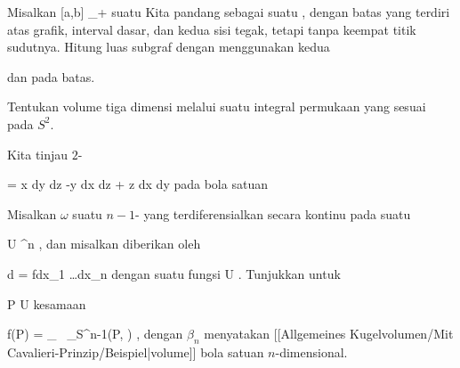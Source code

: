 {}
{

Misalkan
 { [a,b] } { \R_{+}
} {}
suatu
Kita pandang
sebagai suatu
,
dengan batas yang terdiri atas grafik, interval dasar, dan kedua sisi tegak, tetapi tanpa keempat titik sudutnya. Hitung luas subgraf dengan menggunakan kedua

 dan
pada batas.

}
{} {}

{}
{

Tentukan volume
tiga dimensi melalui suatu integral permukaan yang sesuai pada
$S^2$.

}
{} {}

{}
{

Kita tinjau
$2$-

\mavergleichskettedisp
{\vergleichskette
{ \omega
}
{ =} { x dy \wedge dz -y dx \wedge dz + z dx \wedge dy
}
{ } {
}
{ } {
}
{ } {
}
}
{}{}{}
pada bola satuan

}
{} {}

{}
{

Misalkan $\omega$ suatu
$n-1$-
yang terdiferensialkan secara kontinu pada suatu

\mavergleichskette
{\vergleichskette
{ U
}
{ \subseteq }{ \R^n
}
{  }{
}
{    }{
}
{   }{
}
}
{}{}{},
dan misalkan
diberikan oleh

\mavergleichskettedisp
{\vergleichskette
{d \omega
}
{ =} { fdx_1 \wedge \ldots \wedge dx_n
}
{ } {
}
{ } {
}
{ } {
}
}
{}{}{}
dengan suatu fungsi
 { U } {\R
} {.}
Tunjukkan untuk

\mavergleichskette
{\vergleichskette
{ P
}
{ \in }{ U
}
{  }{
}
{    }{
}
{   }{
}
}
{}{}{}
kesamaan

\mavergleichskettedisp
{\vergleichskette
{ f(P)
}
{ =} { {  } \cdot {}_{   \epsilon {}  } \, {  } \int_{S^{n-1}(P, \epsilon)} \omega
}
{ } {
}
{ } {
}
{ } {
}
}
{}{}{,}
dengan $\beta_n$ menyatakan
[[Allgemeines Kugelvolumen/Mit Cavalieri-Prinzip/Beispiel|volume]]
bola satuan $n$-dimensional.

}
{} {}

